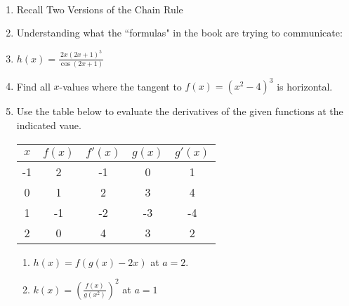 \documentclass[11pt,fleqn]{article}
\begin{document}
\renewcommand{\headrulewidth}{0pt}
\newcommand{\blank}[1]{\rule{#1}{0.75pt}}
\newcommand{\bc}{\begin{center}}
\newcommand{\ec}{\end{center}}
\renewcommand{\d}{\displaystyle}

\vspace*{-0.7in}

\begin{center}
  \large
  \\
\end{center}
\begin{enumerate}
\item Recall Two Versions of the Chain Rule
\vspace{2in}
\item Understanding what the ``formulas" in the book are trying to communicate:
\vspace{3in}
\item $h(x)=\frac{2x(2x+1)^5}{\cos(2x+1)}$
\newpage
\item Find all $x$-values where the tangent to $f(x)=(x^2-4)^3$ is horizontal.
\vfill
\item Use the table below to evaluate the derivatives of the given functions at the indicated vaue.
\begin{tabular}{c||c|c|c|c}
$x$ &$f(x)$ & $f'(x)$ & $g(x)$ & $g'(x)$ \\
\hline \hline
-1 & 2&-1&0&1 \\
\hline
0 & 1&2&3&4 \\
\hline
1& -1&-2&-3&-4 \\
\hline
2&0&4&3&2\\
\end{tabular}
	\begin{enumerate}
	\item $\displaystyle{h(x)=f(g(x)-2x)}$ at $a=2.$
	\vfill
	\item $\displaystyle{k(x)=\left(\frac{f(x)}{g(x^2)}\right)^2}$ at $a=1$
	\vfill
	\end{enumerate}

\end{enumerate}
\end{document}
